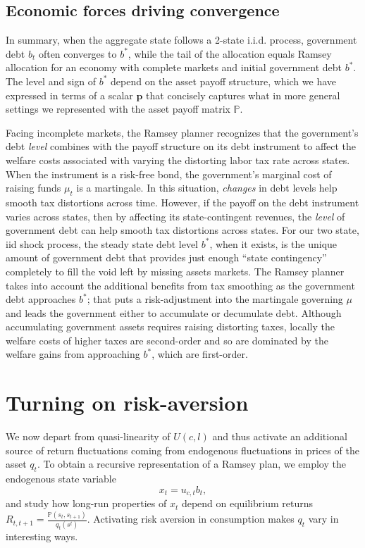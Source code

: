 \documentclass[12pt]{article}
\begin{document}
\subsection{Economic forces driving convergence}
In summary, when the aggregate state follows a 2-state i.i.d. process, government debt  $b_t$ often converges to $b^*$, while
the tail of the allocation equals  Ramsey allocation for an economy with complete markets and initial government  debt $b^*$.
  The level  and sign of $b^*$ depend on the asset payoff structure, which we have  expressed in terms of a  scalar
  $\bm{p}$ that concisely captures what in more general settings we represented with the asset payoff matrix $\mathbb{P}$.


	  Facing incomplete markets, the  Ramsey planner recognizes that   the government's debt {\em level} combines with  the
 payoff structure on its debt instrument to affect  the welfare costs associated with varying the distorting labor tax rate across states.  When the
  instrument is a risk-free bond, the government's marginal cost of raising funds $\mu_t$ is  a martingale. In this situation,
    {\em changes} in debt levels  help smooth tax distortions across time. 		
	However, if the  payoff on the debt instrument varies across states, then  by affecting its state-contingent revenues, the {\em level} of government debt can help smooth tax distortions across states.
	For our two state, iid shock process,  the steady state debt level $b^*$, when it exists, is the unique amount of government debt
that provides just enough ``state contingency'' completely to fill the void left by  missing assets markets.  The Ramsey planner takes into account the additional benefits from tax smoothing as the government debt approaches $b^*$;  that puts a risk-adjustment into the martingale governing $\mu$ and leads the
 government either to accumulate or decumulate debt.	
	 Although accumulating government assets requires  raising distorting  taxes, locally  the welfare costs of higher taxes are second-order and
so are  dominated by the welfare gains from approaching  $b^*$, which are first-order.



\section{Turning on risk-aversion}

  We now depart from quasi-linearity of $U(c,l)$ and thus activate an additional source of return fluctuations coming from endogenous fluctuations in prices of the asset $q_t$.  To obtain a recursive representation of a Ramsey plan,
  we employ the endogenous state variable
  \[x_t=u_{c,t}b_{t} ,\]
  and study how long-run properties of $x_t$ depend on equilibrium returns $R_{t,t+1}=\frac{\mathbb{P}(s_t,s_{t+1})}{q_t(s^t)}$.
   Activating risk aversion in consumption makes $q_t$ vary in interesting ways.
\end{document}
